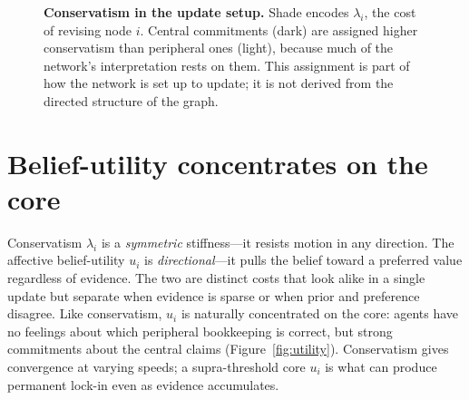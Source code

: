\documentclass[11pt,a4paper]{article}
\newcommand{\biarrow}[2]{%
  \draw[msg] (#1) to[bend left=7] (#2);
  \draw[msg] (#2) to[bend left=7] (#1);}
\def\coreedges{A/B, A/C, B/D, C/D, A/D}
\def\periphedges{A/pA1, A/pA2, A/pA3, B/pB1, B/pB2, B/pB3,
                 C/pC1, C/pC2, C/pC3, D/pD1, D/pD2, D/pD3}
\def\crossedges{pA1/pA2, pA2/pB1, pB3/pD3, pD1/pC3, pA3/pC1}
\begin{document}
\begin{figure}[t]
\centering
{}
\caption{\textbf{Conservatism in the update setup.} Shade encodes $\lambda_i$,
the cost of revising node $i$. Central commitments (dark) are assigned higher
conservatism than peripheral ones (light), because much of the network's
interpretation rests on them. This assignment is part of how the network is set
up to update; it is not derived from the directed structure of the graph.}
\label{fig:conservatism}
\end{figure}

\section{Belief-utility concentrates on the core}

Conservatism $\lambda_i$ is a \emph{symmetric} stiffness---it resists motion in
any direction. The affective belief-utility $u_i$ is \emph{directional}---it
pulls the belief toward a preferred value regardless of evidence. The two are
distinct costs that look alike in a single update but separate when evidence is
sparse or when prior and preference disagree. Like conservatism, $u_i$ is
naturally concentrated on the core: agents have no feelings about which
peripheral bookkeeping is correct, but strong commitments about the central
claims (Figure~\ref{fig:utility}). Conservatism gives convergence at varying
speeds; a supra-threshold core $u_i$ is what can produce permanent lock-in even
as evidence accumulates.
\end{document}
